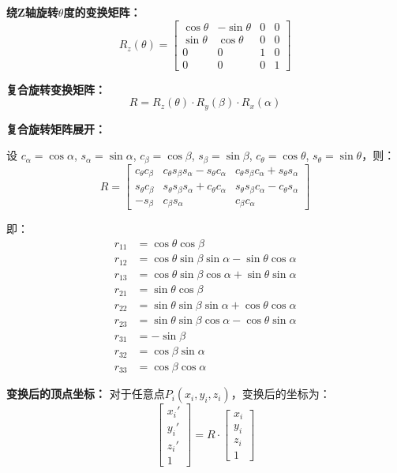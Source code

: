 \documentclass[12pt,a4paper]{article}
\begin{document}
\textbf{绕Z轴旋转$\theta$度的变换矩阵：}
\[
R_z(\theta) = \begin{bmatrix}
\cos\theta & -\sin\theta & 0 & 0 \\
\sin\theta & \cos\theta & 0 & 0 \\
0 & 0 & 1 & 0 \\
0 & 0 & 0 & 1
\end{bmatrix}
\]

\textbf{复合旋转变换矩阵：}
\[
R = R_z(\theta) \cdot R_y(\beta) \cdot R_x(\alpha)
\]

\textbf{复合旋转矩阵展开：}

设 $c_\alpha = \cos\alpha$, $s_\alpha = \sin\alpha$, $c_\beta = \cos\beta$, $s_\beta = \sin\beta$, $c_\theta = \cos\theta$, $s_\theta = \sin\theta$，则：
\[
R = \begin{bmatrix}
c_\theta c_\beta & c_\theta s_\beta s_\alpha - s_\theta c_\alpha & c_\theta s_\beta c_\alpha + s_\theta s_\alpha \\
s_\theta c_\beta & s_\theta s_\beta s_\alpha + c_\theta c_\alpha & s_\theta s_\beta c_\alpha - c_\theta s_\alpha \\
-s_\beta & c_\beta s_\alpha & c_\beta c_\alpha
\end{bmatrix}
\]

即：
\begin{align*}
r_{11} &= \cos\theta\cos\beta \\
r_{12} &= \cos\theta\sin\beta\sin\alpha - \sin\theta\cos\alpha \\
r_{13} &= \cos\theta\sin\beta\cos\alpha + \sin\theta\sin\alpha \\
r_{21} &= \sin\theta\cos\beta \\
r_{22} &= \sin\theta\sin\beta\sin\alpha + \cos\theta\cos\alpha \\
r_{23} &= \sin\theta\sin\beta\cos\alpha - \cos\theta\sin\alpha \\
r_{31} &= -\sin\beta \\
r_{32} &= \cos\beta\sin\alpha \\
r_{33} &= \cos\beta\cos\alpha
\end{align*}

\textbf{变换后的顶点坐标：}
对于任意点$P_i(x_i, y_i, z_i)$，变换后的坐标为：
\[
\begin{bmatrix} x_i' \\ y_i' \\ z_i' \\ 1 \end{bmatrix} = R \cdot \begin{bmatrix} x_i \\ y_i \\ z_i \\ 1 \end{bmatrix}
\]
\end{document}
